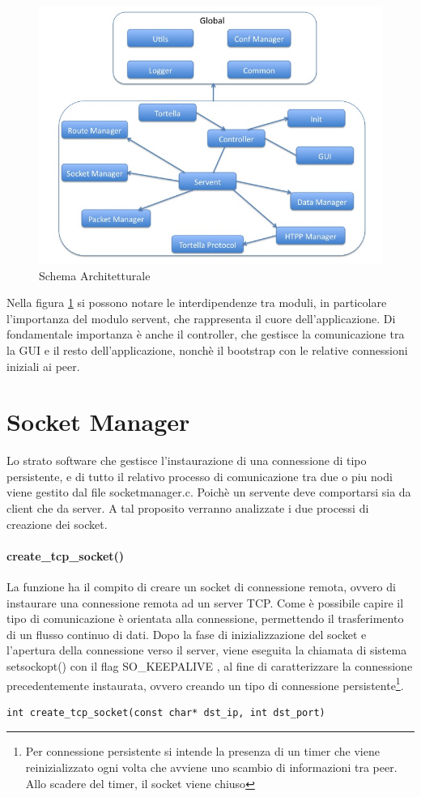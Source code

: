 \begin{figure}[H]
\begin{center}
\includegraphics[scale=0.5]{etc/architectural_overview.png}
\caption{Schema Architetturale}
\label{schemaarchitetturale}
\end{center}
\end{figure}
Nella figura \ref{schemaarchitetturale} si possono notare le interdipendenze tra moduli, in particolare l'importanza del modulo servent, che rappresenta il cuore dell'applicazione. Di fondamentale importanza è anche il controller, che gestisce la comunicazione tra la GUI e il resto dell'applicazione, nonchè il bootstrap con le relative connessioni iniziali ai peer.
\section{Socket Manager}
Lo strato software che gestisce l'instaurazione di una connessione di tipo persistente, e di tutto il relativo processo di comunicazione tra due o piu nodi viene gestito dal file socketmanager.c. Poichè un servente deve comportarsi sia da client che da server. A tal proposito verranno analizzate i due processi di creazione dei socket.
\paragraph{create\_tcp\_socket()}
La funzione ha il compito di creare un socket di connessione remota, ovvero di instaurare una connessione remota ad un server TCP. Come è possibile capire il tipo di comunicazione è orientata alla connessione, permettendo il trasferimento di un flusso continuo di dati.
Dopo la fase di inizializzazione del socket e l'apertura della connessione verso il server, viene eseguita la chiamata di sistema setsockopt() con il flag SO\_KEEPALIVE , al fine di caratterizzare la connessione precedentemente instaurata, ovvero creando un tipo di connessione persistente\footnote{Per connessione persistente si intende la presenza di un timer che viene reinizializzato ogni volta che avviene uno scambio di informazioni tra peer. Allo scadere del timer, il socket viene chiuso}.
\begin{lstlisting}
int create_tcp_socket(const char* dst_ip, int dst_port)
\end{lstlisting}
